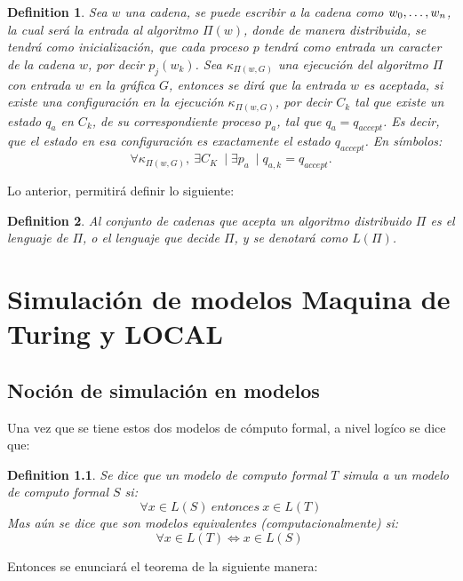 \documentclass[10pt]{report}
\newtheorem{definition}{Definition}
\begin{document}
    \theoremstyle{definition}
    \begin{definition}
        Sea $w$ una cadena, se puede escribir a la cadena como $w_{0},\mathellipsis, w_{n}$, la cual será la entrada al algoritmo
        $\Pi(w)$, donde de manera distribuida, se tendrá como inicialización, que cada proceso $p$ tendrá como entrada un caracter de la cadena $w$, por decir $p_{j}(w_{k})$.\newline
        Sea $\kappa_{\Pi(w,G)}$ una ejecución del algoritmo $\Pi$ con entrada $w$ en la gráfica $G$, entonces se dirá que
        la entrada $w$ es aceptada, si existe una configuración en la ejecución $\kappa_{\Pi(w,G)}$, por decir $C_{k}$ tal que
        existe un estado $q_{a}$ en $C_{k}$, de su correspondiente proceso $p_{a}$, tal que $q_{a}=q_{accept}$.\newline
        Es decir, que el estado en esa configuración es exactamente el estado $q_{accept}$.\newline
        En símbolos:
        \begin{equation}
            \forall \kappa_{\Pi(w,G)},\ \exists C_{K}\ \mid \exists p_{a}\ \mid q_{a,k}=q_{accept}.\label{eq:equation4}
        \end{equation}
    \end{definition}

    Lo anterior, permitirá definir lo siguiente:
    \begin{definition}
        Al conjunto de cadenas que acepta un algoritmo distribuido $\Pi$ es el lenguaje
        de $\Pi$, o el lenguaje que decide $\Pi$, y se denotará como $L(\Pi)$.
    \end{definition}


    \chapter{Simulación de modelos Maquina de Turing y \textbf{LOCAL}}\label{ch:simulacion-de-modelostextbfytextbf}
    \section{Noción de simulación en modelos}\label{sec:nocion-de-simulación-en-modelos}
    Una vez que se tiene estos dos modelos de cómputo formal, a nivel logíco se dice que:
    \theoremstyle{definition}
    \begin{definition}
        Se dice que un modelo de computo formal $T$ simula a un modelo de computo formal  $S$ si:
        \begin{equation}
        \forall x\in L(S) \ entonces \ x\in L(T)
        \end{equation}
        Mas aún se dice que son modelos equivalentes (computacionalmente) si:
        \begin{equation}
        \forall x\in L(T) \iff x\in L(S) \
        \end{equation}
    \end{definition}
    \space
    Entonces se enunciará el teorema de la siguiente manera:
\end{document}
